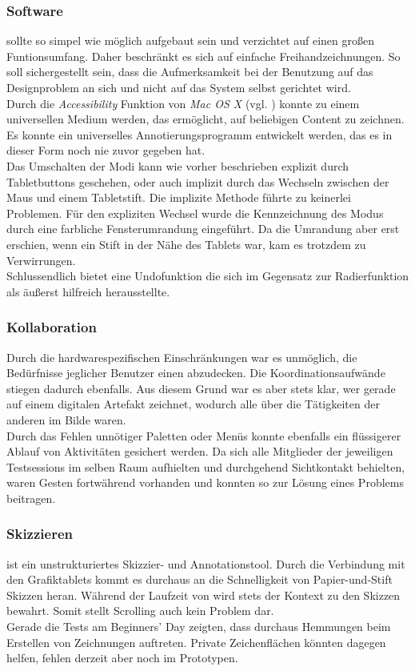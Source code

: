 \subsubsection*{Software}
\scribbler sollte so simpel wie möglich aufgebaut sein und verzichtet auf einen großen Funtionsumfang. Daher beschränkt es sich auf einfache Freihandzeichnungen. So soll sichergestellt sein, dass die Aufmerksamkeit bei der Benutzung auf das Designproblem an sich und nicht auf das System selbst gerichtet wird. \\
Durch die \emph{Accessibility} Funktion von \emph{Mac OS X} (vgl. ) konnte \scribbler zu einem universellen Medium werden, das ermöglicht, auf beliebigen Content zu zeichnen. Es konnte ein universelles Annotierungsprogramm entwickelt werden, das es in dieser Form noch nie zuvor gegeben hat. \\ 
Das Umschalten der Modi kann wie vorher beschrieben explizit durch Tabletbuttons geschehen, oder auch implizit durch das Wechseln zwischen der Maus und einem Tabletstift. Die implizite Methode führte zu keinerlei Problemen. Für den expliziten Wechsel wurde die Kennzeichnung des Modus durch eine farbliche Fensterumrandung eingeführt. Da die Umrandung aber erst erschien, wenn ein Stift in der Nähe des Tablets war, kam es trotzdem zu Verwirrungen. \\
Schlussendlich bietet \scribbler eine Undofunktion die sich im Gegensatz zur Radierfunktion als äußerst hilfreich herausstellte.

\subsubsection*{Kollaboration} 
Durch die hardwarespezifischen Einschränkungen war es unmöglich, die Bedürfnisse jeglicher Benutzer einen abzudecken. Die Koordinationsaufwände stiegen dadurch ebenfalls. Aus diesem Grund war es aber stets klar, wer gerade auf einem digitalen Artefakt zeichnet, wodurch alle über die Tätigkeiten der anderen im Bilde waren.\\
Durch das Fehlen unnötiger Paletten oder Menüs konnte ebenfalls ein flüssigerer Ablauf von Aktivitäten gesichert werden. Da sich alle Mitglieder der jeweiligen Testsessions im selben Raum aufhielten und durchgehend Sichtkontakt behielten, waren Gesten fortwährend vorhanden und konnten so zur Lösung eines Problems beitragen.

\subsubsection*{Skizzieren} 
\scribbler ist ein unstrukturiertes Skizzier- und Annotationstool. Durch die Verbindung mit den Grafiktablets kommt es durchaus an die Schnelligkeit von Papier-und-Stift Skizzen heran. Während der Laufzeit von \scribbler wird stets der Kontext zu den Skizzen bewahrt. Somit stellt Scrolling auch kein Problem dar. \\
Gerade die Tests am Beginners' Day zeigten, dass durchaus Hemmungen beim Erstellen von Zeichnungen auftreten. Private Zeichenflächen könnten dagegen helfen, fehlen derzeit aber noch im Prototypen.

